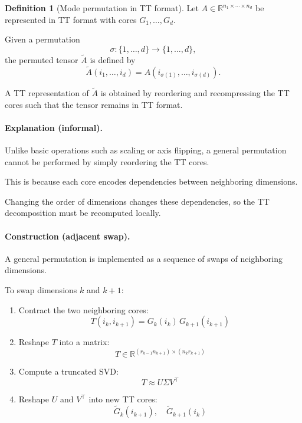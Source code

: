 \documentclass[11pt,a4paper,parskip=half-]{scrartcl}
\theoremstyle{definition}
\newtheorem{definition}{Definition}[section]
\theoremstyle{plain}
\theoremstyle{remark}
\begin{document}
\begin{definition}[Mode permutation in TT format]

Let $A \in \mathbb{R}^{n_1 \times \cdots \times n_d}$ be represented
in TT format with cores $G_1,\dots,G_d$.

Given a permutation
\[
\sigma : \{1,\dots,d\} \to \{1,\dots,d\},
\]
the permuted tensor $\widetilde{A}$ is defined by
\[
\widetilde{A}(i_1,\dots,i_d)
=
A(i_{\sigma(1)},\dots,i_{\sigma(d)}).
\]

A TT representation of $\widetilde{A}$ is obtained by
reordering and recompressing the TT cores such that the
tensor remains in TT format.

\end{definition}

\paragraph{Explanation (informal).}

Unlike basic operations such as scaling or axis flipping,
a general permutation cannot be performed by simply reordering
the TT cores.

This is because each core encodes dependencies between
neighboring dimensions.

Changing the order of dimensions changes these dependencies,
so the TT decomposition must be recomputed locally.

\paragraph{Construction (adjacent swap).}

A general permutation is implemented as a sequence of swaps
of neighboring dimensions.

To swap dimensions $k$ and $k+1$:

\begin{enumerate}
  \item Contract the two neighboring cores:
  \[
  T(i_k,i_{k+1})
  =
  G_k(i_k) \, G_{k+1}(i_{k+1})
  \]

  \item Reshape $T$ into a matrix:
  \[
  T \in \mathbb{R}^{(r_{k-1} n_{k+1}) \times (n_k r_{k+1})}
  \]

  \item Compute a truncated SVD:
  \[
  T \approx U \Sigma V^\top
  \]

  \item Reshape $U$ and $V^\top$ into new TT cores:
  \[
  \widetilde{G}_k(i_{k+1}), \quad \widetilde{G}_{k+1}(i_k)
  \]

\end{enumerate}
\end{document}
